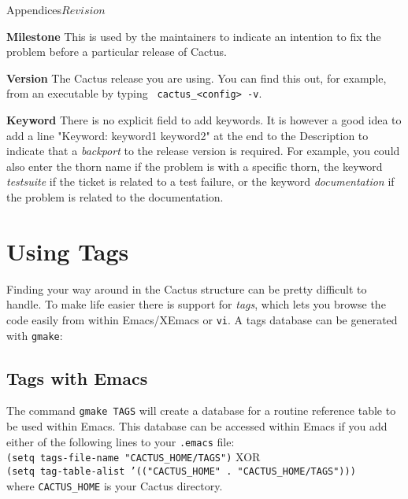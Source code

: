 \begin{cactuspart}{Appendices}{}{$Revision$}
\begin{Lentry}
\item[{\bf Milestone}] This is used by the maintainers to indicate an
  intention to fix the problem before a particular release of Cactus.

\item[{\bf Version}] The Cactus release you are using. You can find
  this out, for example, from an executable by typing {\tt
    cactus\_<config> -v}. %

\item[{\bf Keyword}] There is no explicit field to add keywords. It is
  however a good idea to add a line "Keyword: keyword1 keyword2" at the
  end to the Description to indicate that a \emph{backport} to the
  release version is required.  For example, you could also enter the
  thorn name if the problem is with a specific thorn, the keyword {\em
  testsuite} if the ticket is related to a test failure, or the keyword
  {\em documentation} if the problem is related to the documentation.

\end{Lentry}


\chapter{Using Tags}
\label{sec:Appendix.tags}
Finding your way around in the Cactus structure can be pretty
difficult to handle. To make life easier there is support for \textit{tags},
which lets you browse the code easily from within Emacs/XEmacs or {\tt vi}.
A tags database can be generated with {\tt gmake}:

\section{Tags with Emacs}

The command {\tt gmake TAGS} will create a database for a routine reference
table to be used within Emacs. This database can be accessed within
Emacs if you add either of the following lines to your {\tt .emacs} file:\\
{\tt (setq tags-file-name "CACTUS\_HOME/TAGS")} XOR \\
{\tt (setq tag-table-alist '(("CACTUS\_HOME" . "CACTUS\_HOME/TAGS")))}\\
where {\tt CACTUS\_HOME} is your Cactus directory.\\


\end{cactuspart}
